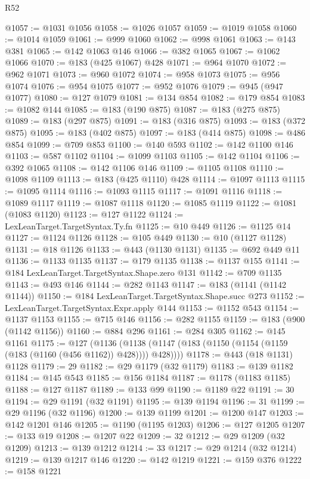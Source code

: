 \begin{lexlean}{R52}
\begin{coremodule}
{{{{{{{{{{{{{{{{{{{{{{{{{{{{{{{{{{{{{{{{{{{{{{{{{{{{{{{{{{{{{{{{{{{{{{{{{{{{{{{{{{{{{{{{{{{{{{{{{{{{{{{{{{{{{{{{{{{{{{{{{{{{{{{{{{{{{{{{{{{{{{{{{{{{{{{{{{{{{{{{{{{{{{{{{{{{{{{{{{{{{{{{{{{{{{{{{{{{{{@1057 := @1031 @1056
@1058 := @1026 @1057
@1059 := @1019 @1058
@1060 := @1014 @1059
@1061 := @999 @1060
@1062 := @998 @1061
@1063 := @143 @381
@1065 := @142 @1063 @146
@1066 := @382 @1065
@1067 := @1062 @1066
@1070 := @183 (@425 @1067) @428
@1071 := @964 @1070
@1072 := @962 @1071
@1073 := @960 @1072
@1074 := @958 @1073
@1075 := @956 @1074
@1076 := @954 @1075
@1077 := @952 @1076
@1079 := @945 (@947 @1077)
@1080 := @127 @1079
@1081 := @134 @854
@1082 := @179 @854
@1083 := @1082 @144
@1085 := @183 (@190 @875)
@1087 := @183 (@275 @875)
@1089 := @183 (@297 @875)
@1091 := @183 (@316 @875)
@1093 := @183 (@372 @875)
@1095 := @183 (@402 @875)
@1097 := @183 (@414 @875)
@1098 := @486 @854
@1099 := @709 @853
@1100 := @140 @593
@1102 := @142 @1100 @146
@1103 := @587 @1102
@1104 := @1099 @1103
@1105 := @142 @1104
@1106 := @392 @1065
@1108 := @142 @1106 @146
@1109 := @1105 @1108
@1110 := @1098 @1109
@1113 := @183 (@425 @1110) @428
@1114 := @1097 @1113
@1115 := @1095 @1114
@1116 := @1093 @1115
@1117 := @1091 @1116
@1118 := @1089 @1117
@1119 := @1087 @1118
@1120 := @1085 @1119
@1122 := @1081 (@1083 @1120)
@1123 := @127 @1122
@1124 := LexLeanTarget.TargetSyntax.Ty.fn
@1125 := @10 @449
@1126 := @1125 @14
@1127 := @1124 @1126
@1128 := @105 @449
@1130 := @10 (@1127 @1128)
@1131 := @18 @1126
@1133 := @443 (@1130 @1131)
@1135 := @692 @449 @11
@1136 := @1133 @1135
@1137 := @179 @1135
@1138 := @1137 @155
@1141 := @184 LexLeanTarget.TargetSyntax.Shape.zero @131
@1142 := @709 @1135
@1143 := @493 @146
@1144 := @282 @1143
@1147 := @183 (@1141 (@1142 @1144))
@1150 := @184 LexLeanTarget.TargetSyntax.Shape.succ @273
@1152 := LexLeanTarget.TargetSyntax.Expr.apply @144
@1153 := @1152 @543
@1154 := @1137 @1153
@1155 := @715 @146
@1156 := @282 @1155
@1159 := @183 (@900 (@1142 @1156))
@1160 := @884 @296
@1161 := @284 @305
@1162 := @145 @1161
@1175 := @127
    (@1136 (@1138 (@1147 (@183 (@1150 (@1154 (@1159 (@183 (@1160 (@456 @1162)) @428)))) @428))))
@1178 := @443 (@18 @1131) @1128
@1179 := 29
@1182 := @29 @1179 (@32 @1179)
@1183 := @139 @1182
@1184 := @145 @543
@1185 := @156 @1184
@1187 := @1178 (@1183 @1185)
@1188 := @127 @1187
@1189 := @133 @99
@1190 := @1189 @22
@1191 := 30
@1194 := @29 @1191 (@32 @1191)
@1195 := @139 @1194
@1196 := 31
@1199 := @29 @1196 (@32 @1196)
@1200 := @139 @1199
@1201 := @1200 @147
@1203 := @142 @1201 @146
@1205 := @1190 (@1195 @1203)
@1206 := @127 @1205
@1207 := @133 @19
@1208 := @1207 @22
@1209 := 32
@1212 := @29 @1209 (@32 @1209)
@1213 := @139 @1212
@1214 := 33
@1217 := @29 @1214 (@32 @1214)
@1219 := @139 @1217 @146
@1220 := @142 @1219
@1221 := @159 @376
@1222 := @158 @1221
}}}}}}}}}}}}}}}}}}}}}}}}}}}}}}}}}}}}}}}}}}}}}}}}}}}}}}}}}}}}}}}}}}}}}}}}}}}}}}}}}}}}}}}}}}}}}}}}}}}}}}}}}}}}}}}}}}}}}}}}}}}}}}}}}}}}}}}}}}}}}}}}}}}}}}}}}}}}}}}}}}}}}}}}}}}}}}}}}}}}}}}}}}}}}}}}}}}}}}
\end{coremodule}
\end{lexlean}

